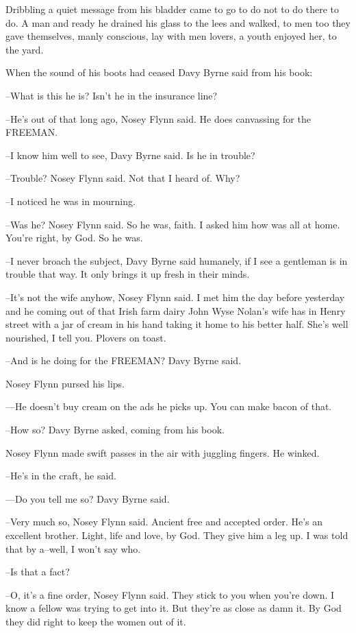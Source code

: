Dribbling a quiet message from his bladder came to go to do not to do
there to do.
A man and ready he drained his glass to the lees and walked,
to men too they gave themselves,
manly conscious,
lay with men lovers,
a
youth enjoyed her,
to the yard.

When the sound of his boots had ceased Davy Byrne said from his book:

--What is this he is?
Isn't he in the insurance line?

--He's out of that long ago,
Nosey Flynn said.
He does canvassing for the
FREEMAN.

--I know him well to see,
Davy Byrne said.
Is he in trouble?

--Trouble?
Nosey Flynn said.
Not that I heard of.
Why?

--I noticed he was in mourning.

--Was he?
Nosey Flynn said.
So he was,
faith.
I asked him how was all at
home.
You're right,
by God.
So he was.

--I never broach the subject,
Davy Byrne said humanely,
if I see a
gentleman is in trouble that way.
It only brings it up fresh in their
minds.

--It's not the wife anyhow,
Nosey Flynn said.
I met him the day before
yesterday and he coming out of that Irish farm dairy John Wyse Nolan's
wife has in Henry street with a jar of cream in his hand taking it home
to his better half.
She's well nourished,
I tell you.
Plovers on toast.

--And is he doing for the FREEMAN?
Davy Byrne said.

Nosey Flynn pursed his lips.

---He doesn't buy cream on the ads he picks up.
You can make bacon of
that.

--How so?
Davy Byrne asked,
coming from his book.

Nosey Flynn made swift passes in the air with juggling fingers.
He
winked.

--He's in the craft,
he said.

---Do you tell me so?
Davy Byrne said.

--Very much so,
Nosey Flynn said.
Ancient free and accepted order.
He's
an excellent brother.
Light,
life and love,
by God.
They give him a leg
up.
I was told that by a--well,
I won't say who.

--Is that a fact?

--O,
it's a fine order,
Nosey Flynn said.
They stick to you when you're
down.
I know a fellow was trying to get into it.
But they're as close as
damn it.
By God they did right to keep the women out of it.

